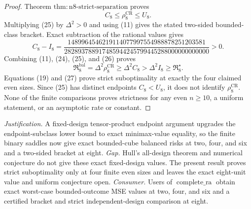 \documentclass{article}
\begin{document}
\begin{proof}
Theorem \(\mathrm{thm{:}n8\mbox{-}strict\mbox{-}separation}\) proves
\[
 C_8\leq\rho_8^{\mathrm{CR}}\leq U_8. \tag{25}
\]
Multiplying (25) by \(\Delta^2>0\) and using (11) gives the stated two-sided bounded-class bracket.  Exact subtraction of the rational values gives
\[
 C_8-I_8
 =\frac{1489964546219114077997554988878251203581}
 {282893788917485944245799445288000000000000}>0. \tag{26}
\]
Combining (11), (24), (25), and (26) proves
\[
 \mathfrak R_8^{\mathrm{bal}}
 =\Delta^2\rho_8^{\mathrm{CR}}
 \geq\Delta^2 C_8
 >\Delta^2I_8
 \geq\mathfrak R_8^\star. \tag{27}
\]
Equations (19) and (27) prove strict suboptimality at exactly the four claimed even sizes.  Since (25) has distinct endpoints \(C_8<U_8\), it does not identify \(\rho_8^{\mathrm{CR}}\).  None of the finite comparisons proves strictness for any even \(n\geq10\), a uniform statement, or an asymptotic rate or constant.
\end{proof}
\par\smallskip\noindent \textit{Justification.} A fixed-design tensor-product endpoint argument upgrades the endpoint-subclass lower bound to exact minimax-value equality, so the finite binary saddles now give exact bounded-cube balanced risks at two, four, and six and a two-sided bracket at eight. \textit{Gap.} Hull's all-design theorem and numerical conjecture do not give these exact fixed-design values. The present result proves strict suboptimality only at four finite even sizes and leaves the exact eight-unit value and uniform conjecture open. \textit{Consumer.} Users of \(\operatorname{complete\_ra}\) obtain exact worst-case bounded-outcome MSE values at two, four, and six and a certified bracket and strict independent-design comparison at eight.
\end{document}
